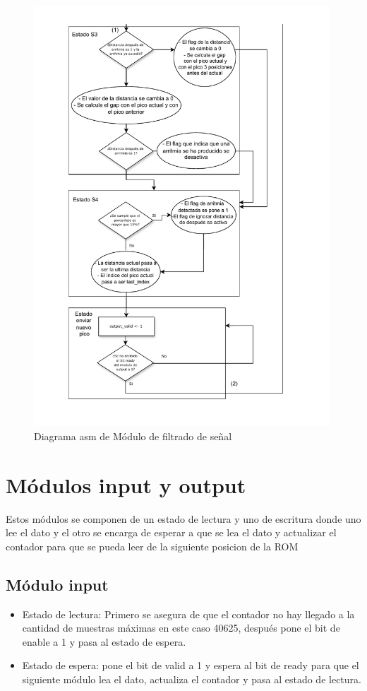 \begin{figure}[h!]
    \centering
    \includegraphics[width=0.99\textwidth]{./Images/img_implementacion_hw/Diagramaasmarritmias2.pdf}
    \caption{Diagrama asm de Módulo de filtrado de señal}
    \label{fig:Diagramaasmarritmias2}
\end{figure} 

\section {Módulos input y output}
Estos módulos se componen de un estado de lectura y uno de escritura donde uno lee el dato y el otro se encarga de esperar a que se lea el dato y actualizar 
el contador para que se pueda leer de la siguiente posicion de la ROM

\subsection{Módulo input}
\begin{itemize}
    \item Estado de lectura: Primero se asegura de que el contador no hay llegado a la cantidad de muestras máximas en este caso 40625, después pone el bit de enable a 1 
    y pasa al estado de espera.
    \item Estado de espera: pone el bit de valid a 1 y espera al bit de ready para que el siguiente módulo lea el dato, actualiza el contador y pasa al estado de lectura.
\end{itemize}


